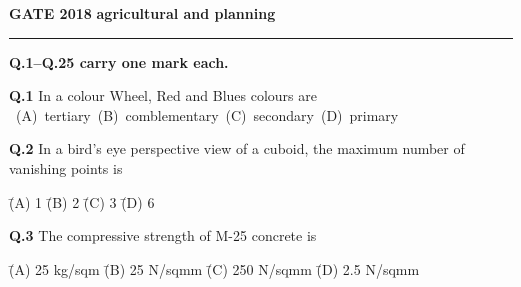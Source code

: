 \documentclass{article}
\begin{document}
\newpage
\noindent

\textbf{GATE 2018}   \hfill    \textbf{agricultural and planning}
\hrule
\vspace{0.6cm}
\textbf{Q.1--Q.25 carry one mark each.}

\vspace{0.5cm}
\noindent \textbf{Q.1} \hspace{0.4cm} In a colour  Wheel, Red and Blues colours are \\
 
\vspace{0.01 cm}
\noindent \mbox{
\hspace{1.5cm} (A) tertiary
\hspace{2cm} (B) comblementary
\hspace{2cm} (C) secondary
\hspace{2cm} (D) primary
} 

\vspace{0.6cm}

\noindent\textbf{Q.2} \hspace{0.5cm} In a bird’s eye perspective view of a cuboid, the maximum number of vanishing points is

\vspace{0.5em}

\begin{tabbing}
\hspace{2cm} \= (A) 1 \hspace{2cm} \= (B) 2 \hspace{2cm} \= (C) 3 \hspace{2cm} \= (D) 6
\end{tabbing}

\vspace{1.5em}

\noindent\textbf{Q.3} \hspace{0.5cm} The compressive strength of M-25 concrete is

\vspace{0.5em}

\begin{tabbing}
\hspace{2cm} \= (A) 25 kg/sqm \hspace{1.7cm} \= (B) 25 N/sqmm \hspace{1.7cm} \= (C) 250 N/sqmm \hspace{1.7cm} \= (D) 2.5 N/sqmm
\end{tabbing}

\vspace{1.5em}
\end{document}
